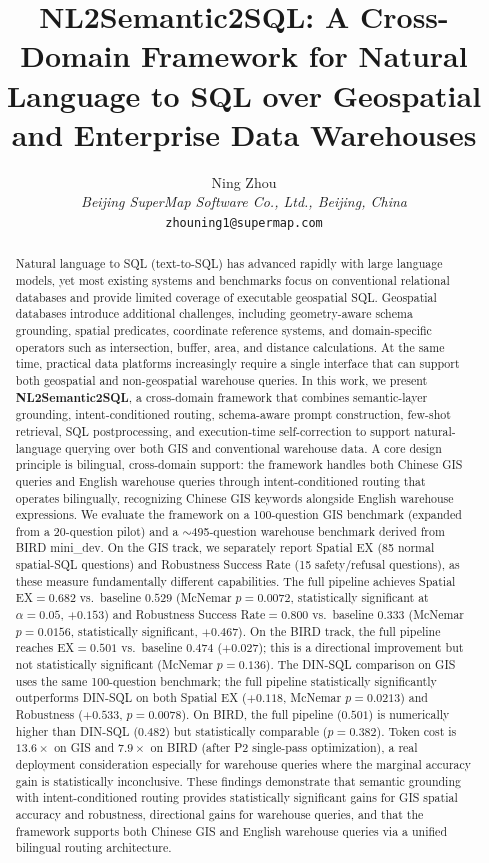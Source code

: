 \documentclass[11pt]{article}
\title{NL2Semantic2SQL: A Cross-Domain Framework for Natural Language to SQL over Geospatial and Enterprise Data Warehouses}
\author{Ning Zhou \\ \textit{Beijing SuperMap Software Co., Ltd., Beijing, China} \\ \texttt{zhouning1@supermap.com}}
\date{}
\begin{document}
\maketitle

\begin{abstract}
Natural language to SQL (text-to-SQL) has advanced rapidly with large language models, yet most existing systems and benchmarks focus on conventional relational databases and provide limited coverage of executable geospatial SQL. Geospatial databases introduce additional challenges, including geometry-aware schema grounding, spatial predicates, coordinate reference systems, and domain-specific operators such as intersection, buffer, area, and distance calculations. At the same time, practical data platforms increasingly require a single interface that can support both geospatial and non-geospatial warehouse queries. In this work, we present \textbf{NL2Semantic2SQL}, a cross-domain framework that combines semantic-layer grounding, intent-conditioned routing, schema-aware prompt construction, few-shot retrieval, SQL postprocessing, and execution-time self-correction to support natural-language querying over both GIS and conventional warehouse data. A core design principle is bilingual, cross-domain support: the framework handles both Chinese GIS queries and English warehouse queries through intent-conditioned routing that operates bilingually, recognizing Chinese GIS keywords alongside English warehouse expressions. We evaluate the framework on a 100-question GIS benchmark (expanded from a 20-question pilot) and a $\sim$495-question warehouse benchmark derived from BIRD mini\_dev. On the GIS track, we separately report Spatial EX (85 normal spatial-SQL questions) and Robustness Success Rate (15 safety/refusal questions), as these measure fundamentally different capabilities. The full pipeline achieves Spatial EX$=0.682$ vs.\ baseline $0.529$ (McNemar $p=0.0072$, statistically significant at $\alpha=0.05$, $+0.153$) and Robustness Success Rate$=0.800$ vs.\ baseline $0.333$ (McNemar $p=0.0156$, statistically significant, $+0.467$). On the BIRD track, the full pipeline reaches EX$=0.501$ vs.\ baseline $0.474$ ($+0.027$); this is a directional improvement but not statistically significant (McNemar $p=0.136$). The DIN-SQL comparison on GIS uses the same 100-question benchmark; the full pipeline statistically significantly outperforms DIN-SQL on both Spatial EX ($+0.118$, McNemar $p=0.0213$) and Robustness ($+0.533$, $p=0.0078$). On BIRD, the full pipeline ($0.501$) is numerically higher than DIN-SQL ($0.482$) but statistically comparable ($p=0.382$). Token cost is $13.6\times$ on GIS and $7.9\times$ on BIRD (after P2 single-pass optimization), a real deployment consideration especially for warehouse queries where the marginal accuracy gain is statistically inconclusive. These findings demonstrate that semantic grounding with intent-conditioned routing provides statistically significant gains for GIS spatial accuracy and robustness, directional gains for warehouse queries, and that the framework supports both Chinese GIS and English warehouse queries via a unified bilingual routing architecture.

\end{abstract}
\end{document}
